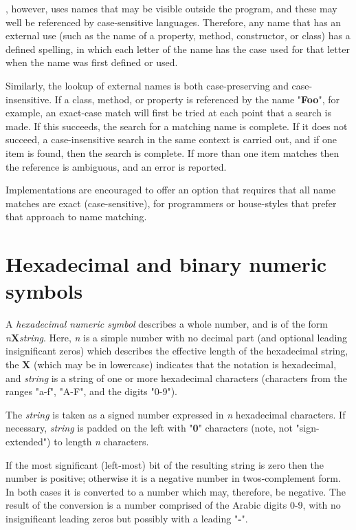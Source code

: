 \nr{}, however, uses names that may be visible outside the \nr{}
program, and these may well be referenced by case-sensitive languages.
Therefore, any name that has an external use (such as the name of a
property, method, constructor, or class) has a defined spelling, in
which each letter of the name has the case used for that letter when the
name was first defined or used.
 
Similarly, the lookup of external names is both case-preserving and
case-insensitive.  If a class, method, or property is referenced by the
name "\textbf{Foo}", for example, an exact-case match will first
be tried at each point that a search is made.
If this succeeds, the search for a matching name is complete.
If it does not succeed, a case-insensitive search in the same context
is carried out, and if one item is found, then the search is complete.
If more than one item matches then the reference is ambiguous, and an
error is reported.
 
Implementations are encouraged to offer an option that requires that all
name matches are exact (case-sensitive), for programmers or house-styles
that prefer that approach to name matching.
\section{Hexadecimal and binary numeric symbols}\label{refhexbin}
 
A \emph{hexadecimal numeric symbol} describes a whole number, and is
of the form \emph{n}\textbf{X}\emph{string}.  Here,
\emph{n} is a simple number with no decimal part (and optional
leading insignificant zeros) which describes the effective length of the
hexadecimal string, the \textbf{X} (which may be in lowercase) indicates
that the notation is hexadecimal, and \emph{string} is a string of
one or more hexadecimal characters (characters from the ranges
"a-f", "A-F", and the digits "0-9").
 
The \emph{string} is taken as a signed number expressed in
\emph{n} hexadecimal characters.  If necessary, \emph{string} is
padded on the left with "\textbf{0}" characters (note, not
"sign-extended") to length \emph{n} characters.
 
If the most significant (left-most) bit of the resulting string is zero
then the number is positive; otherwise it is a negative number in
twos-complement form.  In both cases it is converted to a \nr{} number
which may, therefore, be negative.  The result of the conversion is a
number comprised of the Arabic digits 0-9, with no insignificant leading
zeros but possibly with a leading "\textbf{-}".
 
